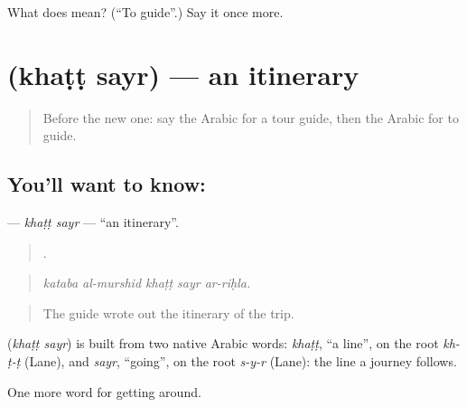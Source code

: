 \begin{tcolorbox}[breakable,colback=teal!4,colframe=teal!35!black,title={Before you move on}]
What does  mean? (\textquotedblleft{}To guide\textquotedblright{}.) Say it once more.
\end{tcolorbox}
\section[\texorpdfstring{\ar{خط} \ar{سير} (khaṭṭ sayr)}{خط سير (khaṭṭ sayr)}]{  (khaṭṭ sayr) — an itinerary}

\label{lesson:AR-C437-khatt-sayr}



\begin{quote}
Before the new one: say the Arabic for a tour guide, then the Arabic for to guide.
\end{quote}

\subsection*{You'll want to know:  }
\textbf{ } — \emph{khaṭṭ sayr} — \textquotedblleft{}an itinerary\textquotedblright{}.

\begin{quote}
    .
\end{quote}

\begin{quote}
\emph{kataba al-murshid khaṭṭ sayr ar-riḥla.}
\end{quote}

\begin{quote}
The guide wrote out the itinerary of the trip.
\end{quote}

\begin{cousinweb}
\textbf{ } (\emph{khaṭṭ sayr}) is built from two native Arabic words: \emph{khaṭṭ}, \textquotedblleft{}a line\textquotedblright{}, on the root \emph{kh-ṭ-ṭ} (Lane), and \emph{sayr}, \textquotedblleft{}going\textquotedblright{}, on the root \emph{s-y-r} (Lane): the line a journey follows.
\end{cousinweb}

\begin{grammarlens}[title={What you've built}]
One more word for getting around.
\end{grammarlens}


